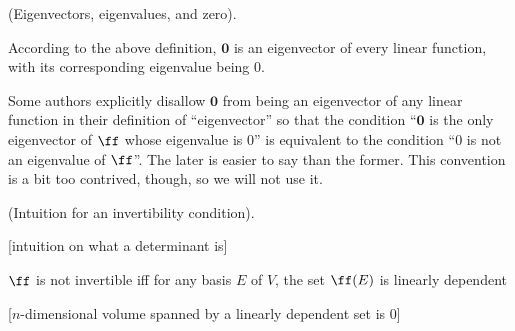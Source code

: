 \begin{remark}
    (Eigenvectors, eigenvalues, and zero).
    
    According to the above definition, $\mathbf{0}$ is an eigenvector of every linear function, with its corresponding eigenvalue being $0$. 
    
    Some authors explicitly disallow $\mathbf{0}$ from being an eigenvector of any linear function in their definition of ``eigenvector'' so that the condition ``$\mathbf{0}$ is the only eigenvector of $\ff$ whose eigenvalue is $0$'' is equivalent to the condition ``$0$ is not an eigenvalue of $\ff$''. The later is easier to say than the former. This convention is a bit too contrived, though, so we will not use it.
\end{remark}

\begin{theorem}
    (Intuition for an invertibility condition).
    
    [intuition on what a determinant is]
    
    $\ff$ is not invertible iff for any basis $E$ of $V$, the set $\ff(E)$ is linearly dependent

    [$n$-dimensional volume spanned by a linearly dependent set is $0$]
\end{theorem}

